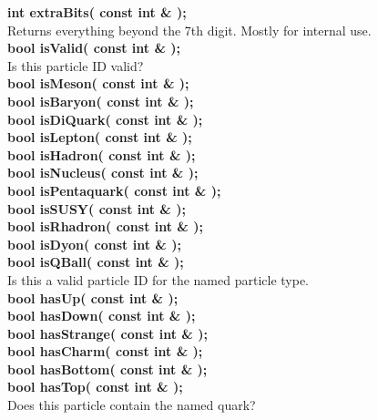 \begin{tabbing}
\hspace{0.5in} {\bf int extraBits( const int \& );} \\
\hspace{1.0in} Returns everything beyond the 7th digit.  Mostly for internal use.  \\

\hspace{0.5in} {\bf bool isValid( const int \& );} \\
\hspace{1.0in}  Is this particle ID valid? \\

\hspace{0.5in} {\bf bool isMeson( const int \& );} \\
\hspace{0.5in} {\bf bool isBaryon( const int \& );} \\
\hspace{0.5in} {\bf bool isDiQuark( const int \& );} \\
\hspace{0.5in} {\bf bool isLepton( const int \& );} \\
\hspace{0.5in} {\bf bool isHadron( const int \& );} \\
\hspace{0.5in} {\bf bool isNucleus( const int \& );} \\
\hspace{0.5in} {\bf bool isPentaquark( const int \& );} \\
\hspace{0.5in} {\bf bool isSUSY( const int \& );} \\
\hspace{0.5in} {\bf bool isRhadron( const int \& );} \\
\hspace{0.5in} {\bf bool isDyon( const int \& );} \\
\hspace{0.5in} {\bf bool isQBall( const int \& );} \\
\hspace{1.0in} Is this a valid particle ID for the named particle type.  \\

\hspace{0.5in} {\bf bool hasUp( const int \& );} \\
\hspace{0.5in} {\bf bool hasDown( const int \& );} \\
\hspace{0.5in} {\bf bool hasStrange( const int \& );} \\
\hspace{0.5in} {\bf bool hasCharm( const int \& );} \\
\hspace{0.5in} {\bf bool hasBottom( const int \& );} \\
\hspace{0.5in} {\bf bool hasTop( const int \& );} \\
\hspace{1.0in} Does this particle contain the named quark? \\


\end{tabbing}
